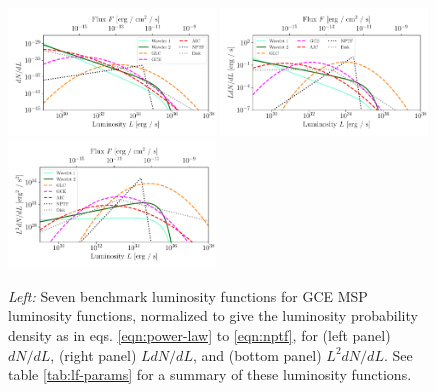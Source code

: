 \documentclass[letter,11pt]{article}
\begin{document}
\begin{figure}
    \centering
    \includegraphics[width=0.49\textwidth]{figs/lum-funcs.pdf}
    \includegraphics[width=0.49\textwidth]{figs/l-lum-funcs.pdf}
    \includegraphics[width=0.49\textwidth]{figs/l2-lum-funcs.pdf}
    \caption{\textit{Left:} Seven benchmark luminosity functions for GCE MSP luminosity functions, normalized to give the luminosity probability density as in eqs. \ref{eqn:power-law} to \ref{eqn:nptf}, for (left panel) $dN/dL$, (right panel) $L dN/dL$, and (bottom panel) $L^2 dN/dL$. See table \ref{tab:lf-params} for a summary of these luminosity functions.}
    \label{fig:lum-funcs}
\end{figure}
\end{document}
